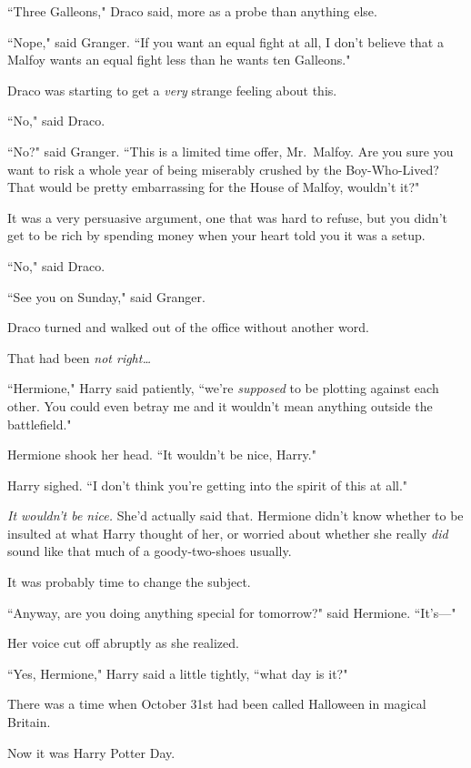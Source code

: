 ``Three Galleons," Draco said, more as a probe than anything else.

``Nope," said Granger. ``If you want an equal fight at all, I don't believe that a Malfoy wants an equal fight less than he wants ten Galleons."

Draco was starting to get a \emph{very} strange feeling about this.

``No," said Draco.

``No?" said Granger. ``This is a limited time offer, Mr.~Malfoy. Are you sure you want to risk a whole year of being miserably crushed by the Boy-Who-Lived? That would be pretty embarrassing for the House of Malfoy, wouldn't it?"

It was a very persuasive argument, one that was hard to refuse, but you didn't get to be rich by spending money when your heart told you it was a setup.

``No," said Draco.

``See you on Sunday," said Granger.

Draco turned and walked out of the office without another word.

That had been \emph{not right{\ldots}}

\later

``Hermione," Harry said patiently, ``we're \emph{supposed} to be plotting against each other. You could even betray me and it wouldn't mean anything outside the battlefield."

Hermione shook her head. ``It wouldn't be nice, Harry."

Harry sighed. ``I don't think you're getting into the spirit of this at all."

\emph{It wouldn't be nice.} She'd actually said that. Hermione didn't know whether to be insulted at what Harry thought of her, or worried about whether she really \emph{did} sound like that much of a goody-two-shoes usually.

It was probably time to change the subject.

``Anyway, are you doing anything special for tomorrow?" said Hermione. ``It's---"

Her voice cut off abruptly as she realized.

``Yes, Hermione," Harry said a little tightly, ``what day is it?"


There was a time when October 31st had been called Halloween in magical Britain.

Now it was Harry Potter Day.

